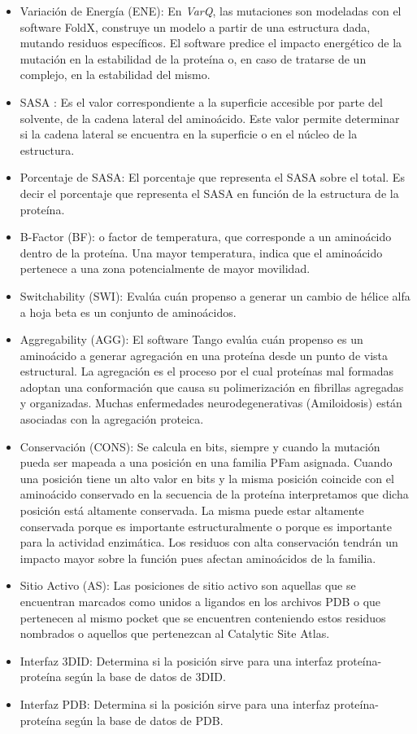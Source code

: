 \begin{itemize}
    \item Variación de Energía (ENE): En \textit{VarQ}, las mutaciones son modeladas con el software FoldX, construye un modelo a partir de una estructura dada, mutando residuos específicos. El software predice el impacto energético de la mutación en la estabilidad de la proteína o, en caso de tratarse de un complejo, en la estabilidad del mismo.
    \item SASA : Es el valor correspondiente a la superficie accesible por parte del solvente, de la cadena lateral del aminoácido. Este valor permite determinar si la cadena lateral se encuentra en la superficie o en el núcleo de la estructura.
    \item Porcentaje de SASA: El porcentaje que representa el SASA sobre el total. Es decir el porcentaje que representa el SASA en función de la estructura de la proteína.
    \item B-Factor (BF): o factor de temperatura, que corresponde a un aminoácido dentro de la proteína. Una mayor temperatura, indica que el aminoácido pertenece a una zona potencialmente de mayor movilidad.
    \item Switchability (SWI): Evalúa cuán propenso a generar un cambio de hélice alfa a hoja beta es un conjunto de aminoácidos.
    \item Aggregability (AGG): El software Tango evalúa cuán
    propenso es un aminoácido a generar agregación en una proteína desde un punto de vista estructural. La agregación es el proceso por el cual proteínas mal formadas
    adoptan una conformación que causa su polimerización en fibrillas agregadas y organizadas. Muchas enfermedades neurodegenerativas (Amiloidosis) están asociadas con la agregación proteica.
    \item Conservación (CONS): Se calcula en bits, siempre y cuando la mutación pueda ser mapeada a una posición en una familia PFam asignada. Cuando una posición tiene un alto valor en bits y la
    misma posición coincide con el aminoácido conservado en la secuencia de la proteína
    interpretamos que dicha posición está altamente conservada. La misma puede estar
    altamente conservada porque es importante estructuralmente o porque es importante para
    la actividad enzimática. Los residuos con alta conservación tendrán un impacto mayor sobre la función pues afectan aminoácidos de la familia.
    \item Sitio Activo (AS): Las posiciones de sitio activo son
    aquellas que se encuentran marcados como unidos a ligandos en los archivos PDB o que
    pertenecen al mismo pocket que se encuentren conteniendo estos residuos nombrados o
    aquellos que pertenezcan al Catalytic Site Atlas.
    \item Interfaz 3DID: Determina si la posición sirve para una interfaz proteína-proteína según la base de datos de 3DID.
    \item Interfaz PDB: Determina si la posición sirve para una interfaz proteína-proteína según la base de datos de PDB.
\end{itemize}


